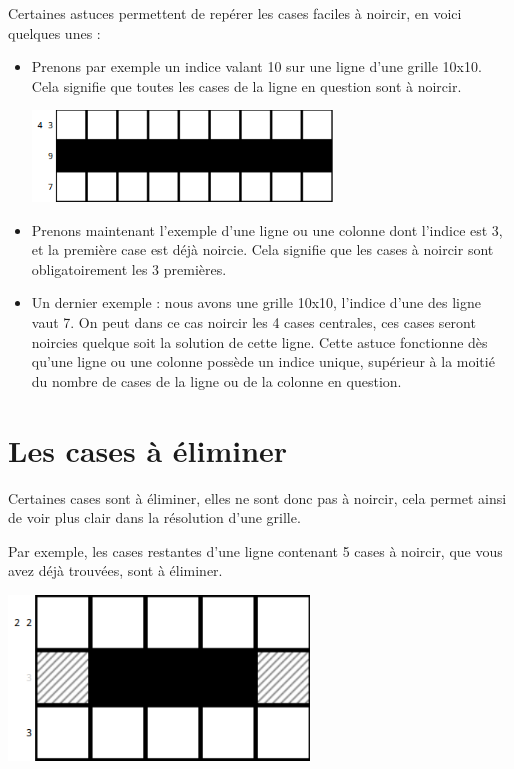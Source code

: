 \documentclass[a4paper, 12pt]{report}
\begin{document}
            Certaines astuces permettent de repérer les cases faciles à noircir, en voici quelques unes :
            \begin{itemize}
                \item Prenons par exemple un indice valant 10 sur une ligne d'une grille 10x10. Cela signifie que toutes les cases de la ligne en question sont à noircir.\\
                \begin{minipage}{\linewidth}
                    \centering
			        \includegraphics[width=8cm]{ligneExemple1.png}
	            \end{minipage}
                \item Prenons maintenant l'exemple d'une ligne ou une colonne dont l'indice est 3, et la première case est déjà noircie. Cela signifie que les cases à noircir sont obligatoirement les 3 premières.
                \item Un dernier exemple : nous avons une grille 10x10, l'indice d'une des ligne vaut 7. On peut dans ce cas noircir les 4 cases centrales, ces cases seront noircies quelque soit la solution de cette ligne. Cette astuce fonctionne dès qu'une ligne ou une colonne possède un indice unique, supérieur à la moitié du nombre de cases de la ligne ou de la colonne en question.
                \end{itemize}


		\section{Les cases à éliminer}
            
            Certaines cases sont à éliminer, elles ne sont donc pas à noircir, cela permet ainsi de voir plus clair dans la résolution d'une grille.
            
            Par exemple, les cases restantes d'une ligne contenant 5 cases à noircir, que vous avez déjà trouvées, sont à éliminer.

            \begin{minipage}{\linewidth}
                    \centering
			        \includegraphics[width=8cm]{ligneExemple4.png}
	        \end{minipage}
\end{document}
